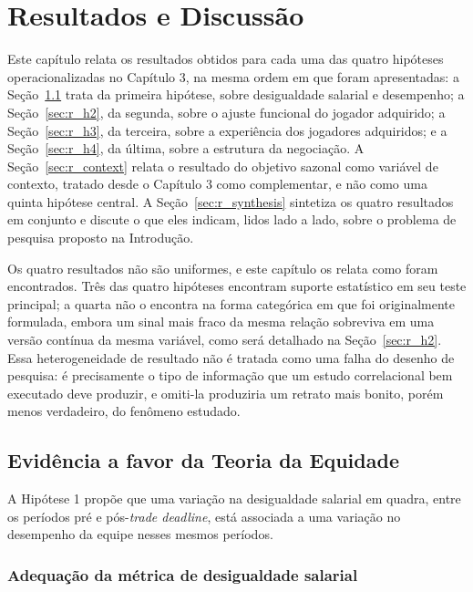 \chapter{Resultados e Discussão}
\label{chp:results}

Este capítulo relata os resultados obtidos para cada uma das quatro hipóteses operacionalizadas no Capítulo 3, na mesma ordem em que foram apresentadas: a Seção~\ref{sec:r_h1} trata da primeira hipótese, sobre desigualdade salarial e desempenho; a Seção~\ref{sec:r_h2}, da segunda, sobre o ajuste funcional do jogador adquirido; a Seção~\ref{sec:r_h3}, da terceira, sobre a experiência dos jogadores adquiridos; e a Seção~\ref{sec:r_h4}, da última, sobre a estrutura da negociação. A Seção~\ref{sec:r_context} relata o resultado do objetivo sazonal como variável de contexto, tratado desde o Capítulo 3 como complementar, e não como uma quinta hipótese central. A Seção~\ref{sec:r_synthesis} sintetiza os quatro resultados em conjunto e discute o que eles indicam, lidos lado a lado, sobre o problema de pesquisa proposto na Introdução.

Os quatro resultados não são uniformes, e este capítulo os relata como foram encontrados. Três das quatro hipóteses encontram suporte estatístico em seu teste principal; a quarta não o encontra na forma categórica em que foi originalmente formulada, embora um sinal mais fraco da mesma relação sobreviva em uma versão contínua da mesma variável, como será detalhado na Seção~\ref{sec:r_h2}. Essa heterogeneidade de resultado não é tratada como uma falha do desenho de pesquisa: é precisamente o tipo de informação que um estudo correlacional bem executado deve produzir, e omiti-la produziria um retrato mais bonito, porém menos verdadeiro, do fenômeno estudado.

\section{Evidência a favor da Teoria da Equidade}
\label{sec:r_h1}

A Hipótese 1 propõe que uma variação na desigualdade salarial em quadra, entre os períodos pré e pós-\textit{trade deadline}, está associada a uma variação no desempenho da equipe nesses mesmos períodos.

\subsection{Adequação da métrica de desigualdade salarial}
\label{sec:r_h1_metric}

